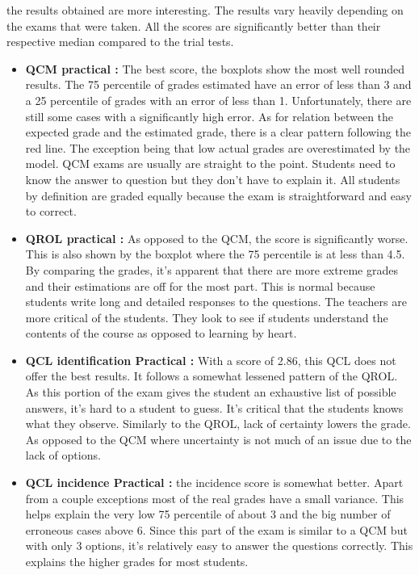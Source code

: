 \documentclass[a4paper,11pt]{report}
\numberwithin{figure}{section} %
\begin{document}
	the results obtained are more interesting.
	The results vary heavily depending on the exams that were taken.
	All the scores are significantly better than their respective median compared to the trial tests.
    \begin{itemize}
    \item[\textbullet]  \textbf{QCM practical :} The best score, the boxplots show the most well rounded results.
    The 75 percentile of grades estimated have an error of less than 3 and a 25 percentile of grades with an error of less than 1.
    Unfortunately, there are still some cases with a significantly high error.
    As for relation between the expected grade and the estimated grade, there is a clear pattern following the red line.
    The exception being that low actual grades are overestimated by the model.
    QCM exams are usually are straight to the point.
    Students need to know the answer to question but they don't have to explain it.
    All students by definition are graded equally because the exam is straightforward and easy to correct.
    \item[\textbullet]  \textbf{QROL practical :} As opposed to the QCM, the score is significantly worse.
    This is also shown by the boxplot where the 75 percentile is at less than 4.5. By comparing the grades, it's apparent that there are more extreme grades and their estimations are off for the most part.
    This is normal because students write long and detailed responses to the questions.
    The teachers are more critical of the students.
    They look to see if students understand the contents of the course as opposed to learning by heart.
    \item[\textbullet]  \textbf{QCL identification Practical :} With a score of 2.86, this QCL does not offer the best results.
    It follows a somewhat lessened pattern of the QROL. As this portion of the exam gives the student an exhaustive list of possible answers, it's hard to a student to guess.
    It's critical that the students knows what they observe.
    Similarly to the QROL, lack of certainty lowers the grade.
    As opposed to the QCM where uncertainty is not much of an issue due to the lack of options.
    \item[\textbullet]  \textbf{QCL incidence Practical :} the incidence score  is somewhat better.
    Apart from a couple exceptions most of the real grades have a small variance.
    This helps explain the very low 75 percentile of about 3 and the big number of erroneous cases above 6.
    Since this part of the exam is similar to a QCM but with only 3 options, it's relatively easy to answer the questions correctly.
    This explains the higher grades for most students.
    \end{itemize}
    
\end{document}
